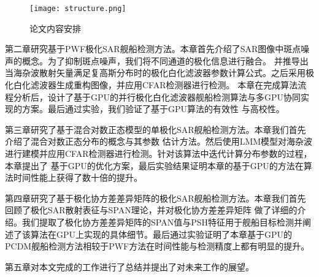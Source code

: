   \begin{figure}[H] %
    \centering
    \texttt{[image: structure.png]}
    \caption{论文内容安排}
    \label{fig:chap1:structure}
  \end{figure}

  第二章研究基于PWF极化SAR舰船检测方法。本章首先介绍了SAR图像中斑点噪声的概念。为了抑制斑点噪声，我们将不同通道的极化信息进行融合。
  并推导出当海杂波散射矢量满足复高斯分布时的极化白化滤波器参数计算公式。之后采用极化白化滤波器生成重构图像，并应用CFAR检测器进行检测。
  本章在完成算法流程分析后，设计了基于GPU的并行极化白化滤波器舰船检测算法与多GPU协同实现的方案。最后通过实验，我们验证了基于GPU算法的有效性
  与高校性。

  第三章研究了基于混合对数正态模型的单极化SAR舰船检测方法。本章我们首先介绍了混合对数正态分布的概念与其参数
  估计方法。然后使用LMM模型对海杂波进行建模并应用CFAR检测器进行检测。针对该算法中迭代计算分布参数的过程，本章提出了
  基于GPU的优化方案，最后实验结果证明本章的基于GPU的方法在算法时间性能上获得了数十倍的提升。

  第四章研究了基于极化协方差差异矩阵的极化SAR舰船检测方法。本章我们首先回顾了极化SAR散射表征与SPAN理论，并对极化协方差差异矩阵
  做了详细的介绍。我们提取了极化协方差差异矩阵的SPAN值与PSH特征用于舰船目标检测并阐述了该算法在GPU上实现的具体细节。最后通过实验证明了本章基于GPU的
  PCDM舰船检测方法相较于PWF方法在时间性能与检测精度上都有明显的提升。

  第五章对本文完成的工作进行了总结并提出了对未来工作的展望。